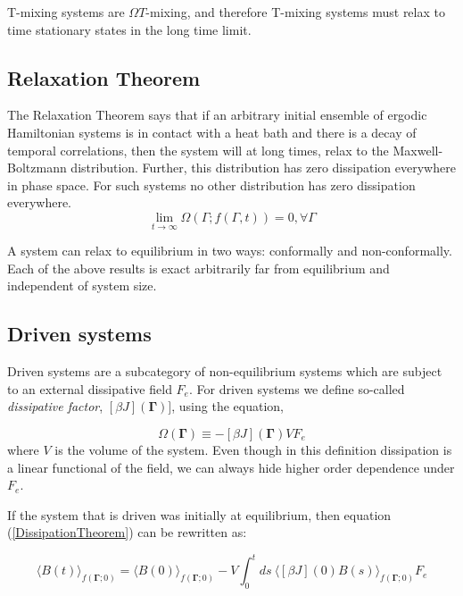 \documentclass[a4paper,12pt,nofootinbib]{article}
\begin{document}
T-mixing systems are $\Omega T$-mixing, and therefore T-mixing systems must relax to time stationary states in the long time limit.


\subsection{Relaxation Theorem}
The Relaxation Theorem says that if an arbitrary initial ensemble of ergodic Hamiltonian systems is in contact with a heat bath and there is a decay of temporal correlations, then the system will at long times, relax to the Maxwell-Boltzmann distribution. Further, this distribution has zero dissipation everywhere in phase space. For such systems no other distribution has zero dissipation everywhere.
\begin{displaymath}
  \lim_{t\to \infty } \Omega (\Gamma ;f(\Gamma ,t))=0, \forall \Gamma
\end{displaymath}

A system can relax to equilibrium in two ways: conformally and non-conformally.
Each of the above results is exact arbitrarily far from equilibrium and independent of system size.

\subsection{Driven systems}

Driven systems are a subcategory of non-equilibrium systems which are subject to an external dissipative field $F_e$.
For driven systems we define so-called \textit{dissipative factor}, $[\beta J](\bm{\Gamma})]$, using the equation,

\begin{equation}
\label{primaryDissipationFunction}
  \Omega(\bm{\Gamma})\equiv -[\beta J](\bm{\Gamma})V F_e
\end{equation}
where $V$ is the volume of the system.
Even though in this definition dissipation is a linear functional of the field, we can always hide higher order dependence under $F_e$.

If the system that is driven was initially at equilibrium, then equation (\ref{DissipationTheorem}) can be rewritten as:

\begin{equation}
  \langle B(t) \rangle_{f(\bm{\Gamma};0)}=\langle B(0) \rangle_{f(\bm{\Gamma};0)} - V \int_0^t ds\ \langle[\beta J](0)B(s)\rangle_{f(\bm{\Gamma};0)} F_e
\end{equation}
\end{document}
